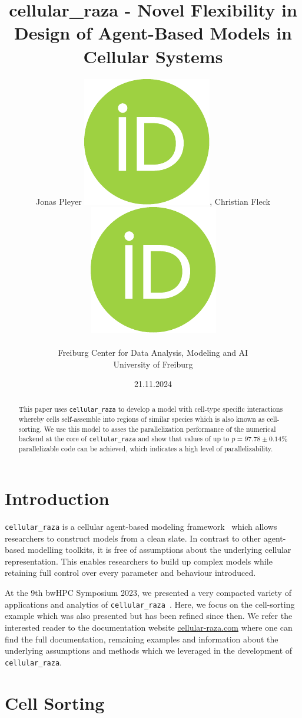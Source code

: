 \documentclass[fontsize=11pt,a4paper]{article}
\title{cellular\_raza - Novel Flexibility in Design of Agent-Based Models in Cellular Systems}
\author{
    Jonas Pleyer
    \href{https://orcid.org/0009-0001-0613-7978}{\includegraphics[scale=0.06]{figures/orcid.pdf}},
    Christian Fleck
    \href{https://orcid.org/0000-0002-6371-4495}{\includegraphics[scale=0.06]{figures/orcid.pdf}}\\\\
    Freiburg Center for Data Analysis, Modeling and AI\\
    University of Freiburg
}
\date{21.11.2024}
\begin{document}
\maketitle

%
%

\begin{abstract}
    This paper uses \texttt{cellular\_raza} to develop a model with cell-type specific interactions
    whereby cells self-assemble into regions of similar species which is also known as cell-sorting.
    We use this model to asses the parallelization performance of the numerical backend at the core
    of \texttt{cellular\_raza} and show that values of up to $p=97.78\pm0.14\%$ parallelizable code
    can be achieved, which indicates a high level of parallelizability.
\end{abstract}

\section{Introduction}\label{introduction}

\texttt{cellular\_raza} is a cellular agent-based modeling framework~\cite{Pleyer2023} which 
allows researchers to construct models from a clean slate.
In contrast to other agent-based modelling toolkits, it is free of assumptions about the underlying
cellular representation.
This enables researchers to build up complex models while retaining full control over every
parameter and behaviour introduced.

At the 9th bwHPC Symposium 2023, we presented a very compacted variety of applications and analytics
of \texttt{cellular\_raza}~\cite{PeaceOfPostersbwHPC}.
Here, we focus on the cell-sorting example which was also presented but has been refined since then.
We refer the interested reader to the documentation website
\href{https://cellular-raza.com}{cellular-raza.com} where one can find the full documentation,
remaining examples and information about the underlying assumptions and methods which we leveraged
in the development of \texttt{cellular\_raza}.

\section{Cell Sorting}
\label{sec:cell-sorting}
\end{document}
